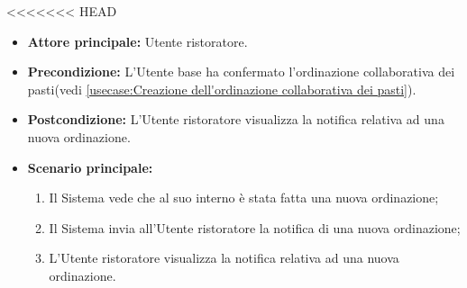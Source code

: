 <<<<<<< HEAD
\label{usecase:Visualizzazione notifica nuovo ordine}
\begin{itemize}
	\item \textbf{Attore principale:} Utente ristoratore.

	\item \textbf{Precondizione:} L'Utente base ha confermato l'ordinazione collaborativa dei pasti(vedi \autoref{usecase:Creazione dell'ordinazione collaborativa dei pasti}).

	\item \textbf{Postcondizione:} L'Utente ristoratore visualizza la notifica relativa ad una nuova ordinazione.

	\item \textbf{Scenario principale:}
	      \begin{enumerate}
		      \item Il Sistema vede che al suo interno è stata fatta una nuova ordinazione;
		      \item Il Sistema invia all'Utente ristoratore la notifica di una nuova ordinazione;
		      \item L'Utente ristoratore visualizza la notifica relativa ad una nuova ordinazione.
	      \end{enumerate}
\end{itemize}
